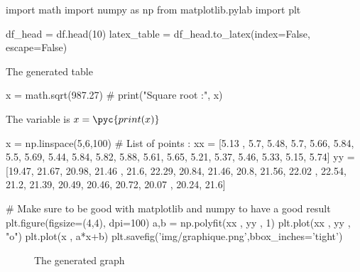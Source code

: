 \documentclass[11pt]{article}%
\begin{document}
\begin{pycode}
import math
import numpy as np
from matplotlib.pylab import plt    
\end{pycode}


\begin{pycode}
df_head = df.head(10)
latex_table = df_head.to_latex(index=False, escape=False)
\end{pycode}
    
\begin{table}
\centering
{}
\caption{The generated table}
\end{table}


\begin{pycode}
x = math.sqrt(987.27)
# print("Square root :",  x)
\end{pycode}

\vspace{5em}

The variable is $x=\pyc{print(x)}$


\begin{pycode}
x = np.linspace(5,6,100)
# List of points :
xx = [5.13 , 5.7, 5.48, 5.7, 5.66, 5.84, 5.5, 5.69, 5.44, 5.84, 5.82, 5.88, 5.61, 5.65, 5.21, 5.37, 5.46, 5.33, 5.15, 5.74]
yy = [19.47, 21.67, 20.98, 21.46 , 21.6, 22.29, 20.84, 21.46, 20.8, 21.56, 22.02 , 22.54, 21.2, 21.39, 20.49, 20.46, 20.72, 20.07 , 20.24, 21.6]

# Make sure to be good with matplotlib and numpy to have a good result
plt.figure(figsize=(4,4), dpi=100)
a,b = np.polyfit(xx , yy , 1)
plt.plot(xx , yy , "o")
plt.plot(x , a*x+b)
plt.savefig('img/graphique.png',bbox_inches='tight')
\end{pycode}

\begin{figure}
    \caption{The generated graph}
\end{figure}
\end{document}
